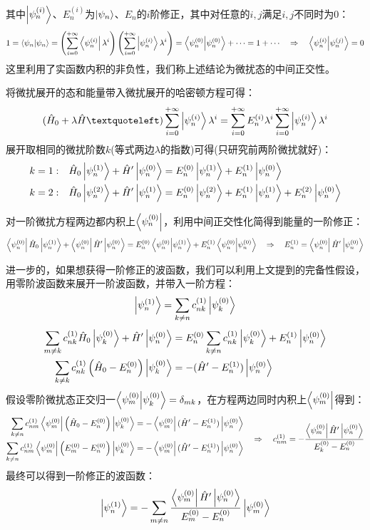 其中$\ket{\psi_n^{(i)}}$、$E_n^{(i)}$为$\ket{\psi_n}$、$E_n$的$i$阶修正，其中对任意的$i,j$满足$i,j$不同时为0：
\[1=\bra{\psi_n}\ket{\psi_n}=\left(\sum_{i=0}^{+\infty}\bra{\psi_n^{(i)}}\lambda^i\right)\left(\sum_{i=0}^{+\infty}\ket{\psi_n^{(i)}}\lambda^i\right)=\bra{\psi_n^{(0)}}\ket{\psi_n^{(0)}}+\cdots=1 +\cdots \quad \Rightarrow \quad \bra{\psi_n^{(i)}}\ket{\psi_n^{(j)}}=0\]
这里利用了实函数内积的非负性，我们称上述结论为微扰态的中间正交性。

将微扰展开的态和能量带入微扰展开的哈密顿方程可得：
\[(\hat{H}_0+\lambda\hat{H}‘)\sum_{i=0}^{+\infty}\ket{\psi_n^{(i)}}\lambda^i=\sum_{i=0}^{+\infty}E_n^{(i)}\lambda^i\sum_{i=0}^{+\infty}\ket{\psi_n^{(i)}}\lambda^i\]
展开取相同的微扰阶数$k$(等式两边$\lambda$的指数)可得(只研究前两阶微扰就好)：
\[\begin{aligned}
k=1: \quad & \hat{H}_0\ket{\psi_n^{(1)}}+\hat{H}'\ket{\psi_n^{(0)}}=E_n^{(0)}\ket{\psi_n^{(1)}}+E_n^{(1)}\ket{\psi_n^{(0)}}\\
k=2: \quad & \hat{H}_0\ket{\psi_n^{(2)}}+\hat{H}'\ket{\psi_n^{(1)}}=E_n^{(0)}\ket{\psi_n^{(2)}}+E_n^{(1)}\ket{\psi_n^{(1)}}+E_n^{(2)}\ket{\psi_n^{(0)}}
\end{aligned}\]

对一阶微扰方程两边都内积上$\bra{\psi_n^{(0)}}$，利用中间正交性化简得到能量的一阶修正：
\[\bra{\psi_n^{(0)}}\hat{H}_0\ket{\psi_n^{(1)}}+\bra{\psi_n^{(0)}}\hat{H}'\ket{\psi_n^{(0)}}=E_n^{(0)}\bra{\psi_n^{(0)}}\ket{\psi_n^{(1)}}+E_n^{(1)}\bra{\psi_n^{(0)}}\ket{\psi_n^{(0)}} \quad \Rightarrow \quad E_n^{(1)}=\bra{\psi_n^{(0)}}\hat{H}'\ket{\psi_n^{(0)}}\]

进一步的，如果想获得一阶修正的波函数，我们可以利用上文提到的完备性假设，用零阶波函数来展开一阶波函数，并带入一阶方程：
\[\ket{\psi_n^{(1)}}=\sum_{k\neq n}c_{nk}^{(1)}\ket{\psi_k^{(0)}}\]
\[\begin{aligned}
\sum_{m\neq k}c_{nk}^{(1)}\hat{H}_0\ket{\psi_k^{(0)}}+\hat{H}'\ket{\psi_n^{(0)}}&=E_n^{(0)}\sum_{k\neq n}c_{nk}^{(1)}\ket{\psi_k^{(0)}}+E_n^{(1)}\ket{\psi_n^{(0)}} \\ 
\sum_{k\neq k}c_{nk}^{(1)}\left(\hat{H}_0-E_n^{(0)}\right)\ket{\psi_k^{(0)}}&=-(\hat{H}'-E_n^{(1)})\ket{\psi_n^{(0)}}
\end{aligned}\]
假设零阶微扰态正交归一$\bra{\psi_m^{(0)}}\ket{\psi_k^{(0)}}=\delta_{mk}$，在方程两边同时内积上$\bra{\psi_m^{(0)}}$得到：
\[\begin{aligned}
\sum_{k\neq n}c_{nm}^{(1)}\bra{\psi_m^{(0)}}\left(\hat{H}_0-E_n^{(0)}\right)\ket{\psi_k^{(0)}}&=-\bra{\psi_m^{(0)}}(\hat{H}'-E_n^{(1)})\ket{\psi_n^{(0)}}\\
\sum_{k\neq n}c_{nm}^{(1)}\bra{\psi_m^{(0)}}\left(E_m^{(0)}-E_n^{(0)}\right)\ket{\psi_k^{(0)}}&=-\bra{\psi_m^{(0)}}(\hat{H}'-E_n^{(1)})\ket{\psi_n^{(0)}}
\end{aligned} \quad \Rightarrow \quad c_{nm}^{(1)}=-\frac{\bra{\psi_m^{(0)}}\hat{H}'\ket{\psi_n^{(0)}}}{E_k^{(0)}-E_n^{(0)}}\]
最终可以得到一阶修正的波函数：
\[\ket{\psi_n^{(1)}}=-\sum_{m\neq n}\frac{\bra{\psi_m^{(0)}}\hat{H}'\ket{\psi_n^{(0)}}}{E_m^{(0)}-E_n^{(0)}}\ket{\psi_m^{(0)}}\]

